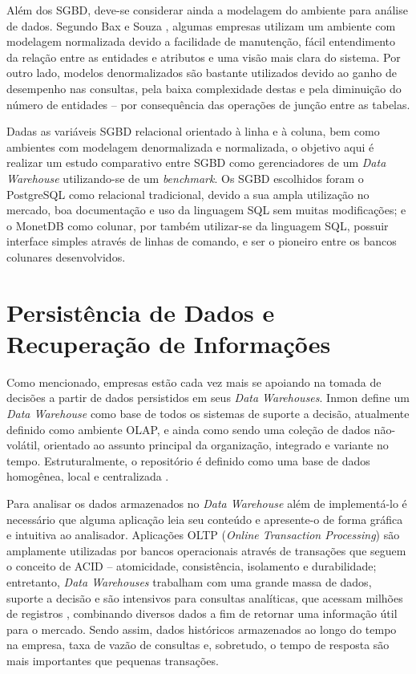 \documentclass[conference]{IEEEtran}
\begin{document}
Além dos SGBD, deve-se considerar ainda a modelagem do ambiente para análise de dados. Segundo Bax e Souza \cite{bax2003modelagem}, algumas empresas utilizam um ambiente com modelagem normalizada devido a facilidade de manutenção, fácil entendimento da relação entre as entidades e atributos e uma visão mais clara do sistema. Por outro lado, modelos denormalizados são bastante utilizados devido ao ganho de desempenho nas consultas, pela baixa complexidade destas e pela diminuição do número de entidades -- por consequência das operações de junção entre as tabelas.

Dadas as variáveis SGBD relacional orientado à linha e à coluna, bem como ambientes com modelagem denormalizada e normalizada, o objetivo aqui é realizar um estudo comparativo entre SGBD como gerenciadores de um \textit{Data Warehouse} utilizando-se de um \textit{benchmark}. Os SGBD escolhidos foram o PostgreSQL como relacional tradicional, devido a sua ampla utilização no mercado, boa documentação e uso da linguagem SQL sem muitas modificações; e o MonetDB como colunar, por também utilizar-se da linguagem SQL, possuir interface simples através de linhas de comando, e ser o pioneiro entre os bancos colunares desenvolvidos.

\section{Persistência de Dados e Recuperação de Informações}

Como mencionado, empresas estão cada vez mais se apoiando na tomada de decisões a partir de dados persistidos em seus \textit{Data Warehouses}. Inmon \cite{inmon2005building} define um \textit{Data Warehouse} como base de todos os sistemas de suporte a decisão, atualmente definido como ambiente OLAP, e ainda como sendo uma coleção de dados não-volátil, orientado ao assunto principal da organização, integrado e variante no tempo. Estruturalmente, o repositório é definido como uma base de dados homogênea, local e centralizada \cite{wrembel2007data}.

Para analisar os dados armazenados no \textit{Data Warehouse} além de implementá-lo é necessário que alguma aplicação leia seu conteúdo e apresente-o de forma gráfica e intuitiva ao analisador. Aplicações OLTP (\textit{Online Transaction Processing}) são amplamente utilizadas por bancos operacionais através de transações que seguem o conceito de ACID -- atomicidade, consistência, isolamento e durabilidade; entretanto, \textit{Data Warehouses} trabalham com uma grande massa de dados, suporte a decisão e são intensivos para consultas analíticas, que acessam milhões de registros \cite{chaudhuri1997overview}, combinando diversos dados a fim de retornar uma informação útil para o mercado. Sendo assim, dados históricos armazenados ao longo do tempo na empresa, taxa de vazão de consultas e, sobretudo, o tempo de resposta são mais importantes que pequenas transações. 
\end{document}
